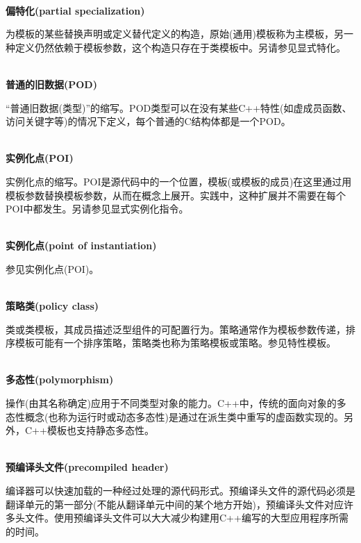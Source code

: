 \hspace*{\fill} \\ %
\noindent
\textbf{偏特化(partial specialization)}

为模板的某些替换声明或定义替代定义的构造，原始(通用)模板称为主模板，另一种定义仍然依赖于模板参数，这个构造只存在于类模板中。另请参见显式特化。

\hspace*{\fill} \\ %
\noindent
\textbf{普通的旧数据(POD)}

“普通旧数据(类型)”的缩写。POD类型可以在没有某些C++特性(如虚成员函数、访问关键字等)的情况下定义，每个普通的C结构体都是一个POD。

\hspace*{\fill} \\ %
\noindent
\textbf{实例化点(POI)}

实例化点的缩写。POI是源代码中的一个位置，模板(或模板的成员)在这里通过用模板参数替换模板参数，从而在概念上展开。实践中，这种扩展并不需要在每个POI中都发生。另请参见显式实例化指令。

\hspace*{\fill} \\ %
\noindent
\textbf{实例化点(point of instantiation)}

参见实例化点(POI)。

\hspace*{\fill} \\ %
\noindent
\textbf{策略类(policy class)}

类或类模板，其成员描述泛型组件的可配置行为。策略通常作为模板参数传递，排序模板可能有一个排序策略，策略类也称为策略模板或策略。参见特性模板。

\hspace*{\fill} \\ %
\noindent
\textbf{多态性(polymorphism)}

操作(由其名称确定)应用于不同类型对象的能力。C++中，传统的面向对象的多态性概念(也称为运行时或动态多态性)是通过在派生类中重写的虚函数实现的。另外，C++模板也支持静态多态性。

\hspace*{\fill} \\ %
\noindent
\textbf{预编译头文件(precompiled header)}

编译器可以快速加载的一种经过处理的源代码形式。预编译头文件的源代码必须是翻译单元的第一部分(不能从翻译单元中间的某个地方开始)，预编译头文件对应许多头文件。使用预编译头文件可以大大减少构建用C++编写的大型应用程序所需的时间。

